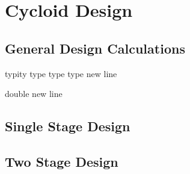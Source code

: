 
\chapter{Cycloid Design}\label{ch:design}


\section{General Design Calculations} \label{design:basic_calc}

typity type type type
new line

double new line 

\section{Single Stage Design} \label{design:single}

\section{Two Stage Design} \label{design:dual}
